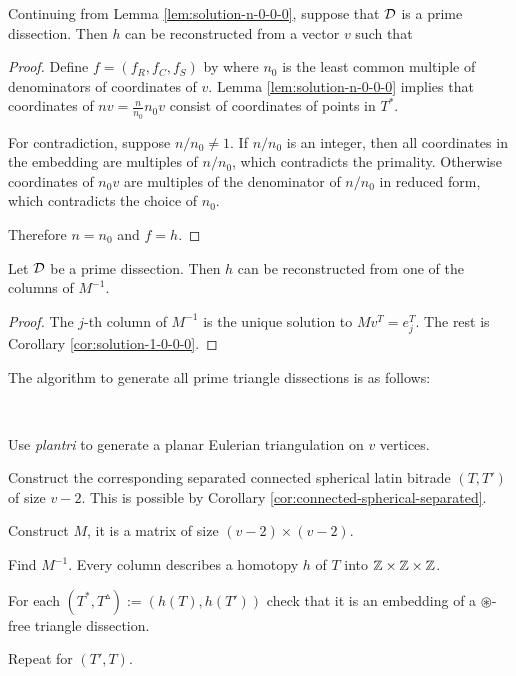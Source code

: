 \begin{cor}
\label{cor:solution-1-0-0-0}
Continuing from Lemma \ref{lem:solution-n-0-0-0}, suppose that $\mathcal D$ is a prime dissection. Then $h$ can be reconstructed from a vector $v$ such that
%
\end{cor}
\begin{proof}
Define $f = (f_R, f_C, f_S)$ by
%
where $n_0$ is the least common multiple of denominators of coordinates of $v$. Lemma \ref{lem:solution-n-0-0-0} implies that coordinates of $nv = \frac{n}{n_0}n_0v$ consist of coordinates of points in $T^*$.

For contradiction, suppose $n/n_0 \ne 1$. If $n/n_0$ is an integer, then all coordinates in the embedding are multiples of $n/n_0$, which contradicts the primality. Otherwise coordinates of $n_0v$ are multiples of the denominator of $n/n_0$ in reduced form, which contradicts the choice of $n_0$.

Therefore $n = n_0$ and $f=h$.
\end{proof}

\begin{lem}
Let $\mathcal D$ be a prime dissection. Then $h$ can be reconstructed from one of the columns of $M^{-1}$.
\end{lem}%
\begin{proof}
The $j$-th column of $M^{-1}$ is the unique solution to $Mv^T = e_j^T$. The rest is Corollary \ref{cor:solution-1-0-0-0}.
\end{proof}

The algorithm to generate all prime triangle dissections is as follows:

\begin{alg}\ 
\label{alg:tranquility}
\begin{cosyenumerate}
	\item Use \emph{plantri} to generate a planar Eulerian triangulation on $v$ vertices.
	\item Construct the corresponding separated connected spherical latin bitrade $(T,T')$ of size $v-2$. This is possible by Corollary \ref{cor:connected-spherical-separated}.
	\item Construct $M$, it is a matrix of size $(v-2) \times (v-2)$.
	\item Find $M^{-1}$. Every column describes a homotopy $h$ of $T$ into $\mathbb Z\times\mathbb Z\times\mathbb Z$.
	\item For each $(T^*,T^\vartriangle) := (h(T),h(T'))$ check that it is an embedding of a $\circledast$-free triangle dissection.
	\item Repeat for $(T',T)$.
\end{cosyenumerate}
\end{alg}%

